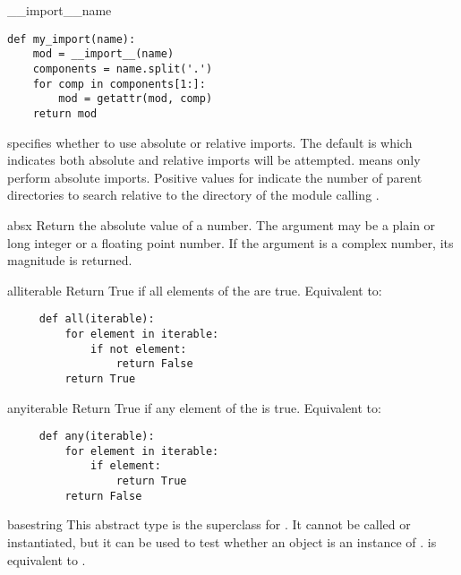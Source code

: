 \begin{funcdesc}{__import__}{name}
\begin{verbatim}
def my_import(name):
    mod = __import__(name)
    components = name.split('.')
    for comp in components[1:]:
        mod = getattr(mod, comp)
    return mod
\end{verbatim}

   specifies whether to use absolute or relative imports.
  The default is  which indicates both absolute and relative
  imports will be attempted.   means only perform absolute imports.
  Positive values for  indicate the number of parent directories
  to search relative to the directory of the module calling
  .
\end{funcdesc}

\begin{funcdesc}{abs}{x}
  Return the absolute value of a number.  The argument may be a plain
  or long integer or a floating point number.  If the argument is a
  complex number, its magnitude is returned.
\end{funcdesc}

\begin{funcdesc}{all}{iterable}
  Return True if all elements of the  are true.
  Equivalent to:
  \begin{verbatim}
     def all(iterable):
         for element in iterable:
             if not element:
                 return False
         return True
  \end{verbatim}
\end{funcdesc}

\begin{funcdesc}{any}{iterable}
  Return True if any element of the  is true.
  Equivalent to:
  \begin{verbatim}
     def any(iterable):
         for element in iterable:
             if element:
                 return True
         return False
  \end{verbatim}
\end{funcdesc}

\begin{funcdesc}{basestring}{}
  This abstract type is the superclass for .
  It cannot be called or instantiated, but it can be used to test whether
  an object is an instance of .
   is equivalent to
  .
\end{funcdesc}

